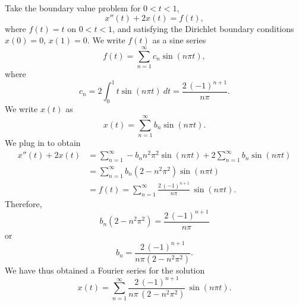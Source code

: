 \begin{example}
Take the boundary value problem for $0 < t < 1$,
\begin{equation*}
x''(t) + 2 x(t) = f(t) ,
\end{equation*}
where $f(t) = t$ on $0 < t < 1$, and 
satisfying the Dirichlet boundary conditions
$x(0) = 0$, $x(1)=0$.
We write $f(t)$ as a sine series
\begin{equation*}
f(t) = \sum_{n=1}^\infty c_n \sin (n \pi t) ,
\end{equation*}
where
\begin{equation*}
c_n = 2 \int_0^1 t \sin (n \pi t) ~dt = \frac{2 \, {(-1)}^{n+1}}{n \pi} .
\end{equation*}
We write $x(t)$ as
\begin{equation*}
x(t) = \sum_{n=1}^\infty b_n \sin (n \pi t) .
\end{equation*}
We plug in to obtain 
\begin{equation*}
\begin{split}
x''(t) + 2 x(t) & =
\sum_{n=1}^\infty - b_n n^2 \pi^2 \sin (n \pi t) 
+
2
\sum_{n=1}^\infty b_n \sin (n \pi t)
\\
& =
\sum_{n=1}^\infty b_n (2 - n^2 \pi^2 ) \sin (n \pi t)
\\
& = f(t)
=
\sum_{n=1}^\infty  \frac{2\, {(-1)}^{n+1}}{n \pi} \, \sin (n \pi t) .
\end{split}
\end{equation*}
Therefore,
\begin{equation*}
b_n (2 - n^2 \pi^2)
=
\frac{2\,{(-1)}^{n+1}}{n \pi}
\end{equation*}
or
\begin{equation*}
b_n
=
\frac{2\,{(-1)}^{n+1}}{n \pi (2 - n^2 \pi^2)} .
\end{equation*}
We have thus obtained a Fourier series for the solution
\begin{equation*}
x(t) = 
\sum_{n=1}^\infty
\frac{2\,{(-1)}^{n+1}}{n \pi \,(2 - n^2 \pi^2)} \,
\sin (n \pi t) .
\end{equation*}
\end{example}


